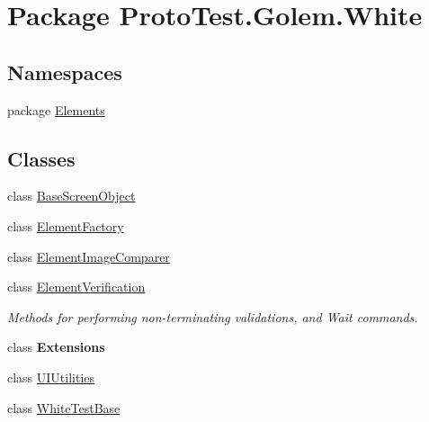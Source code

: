\hypertarget{namespace_proto_test_1_1_golem_1_1_white}{\section{Package Proto\-Test.\-Golem.\-White}
\label{namespace_proto_test_1_1_golem_1_1_white}
}
\subsection*{Namespaces}
\begin{DoxyCompactItemize}
\item 
package \hyperlink{namespace_proto_test_1_1_golem_1_1_white_1_1_elements}{Elements}
\end{DoxyCompactItemize}
\subsection*{Classes}
\begin{DoxyCompactItemize}
\item 
class \hyperlink{class_proto_test_1_1_golem_1_1_white_1_1_base_screen_object}{Base\-Screen\-Object}
\item 
class \hyperlink{class_proto_test_1_1_golem_1_1_white_1_1_element_factory}{Element\-Factory}
\item 
class \hyperlink{class_proto_test_1_1_golem_1_1_white_1_1_element_image_comparer}{Element\-Image\-Comparer}
\item 
class \hyperlink{class_proto_test_1_1_golem_1_1_white_1_1_element_verification}{Element\-Verification}
\begin{DoxyCompactList}\small\item\em Methods for performing non-\/terminating validations, and Wait commands. \end{DoxyCompactList}\item 
class {\bfseries Extensions}
\item 
class \hyperlink{class_proto_test_1_1_golem_1_1_white_1_1_u_i_utilities}{U\-I\-Utilities}
\item 
class \hyperlink{class_proto_test_1_1_golem_1_1_white_1_1_white_test_base}{White\-Test\-Base}
\end{DoxyCompactItemize}
